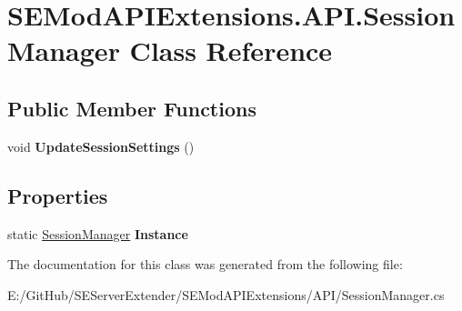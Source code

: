 \hypertarget{class_s_e_mod_a_p_i_extensions_1_1_a_p_i_1_1_session_manager}{}\section{S\+E\+Mod\+A\+P\+I\+Extensions.\+A\+P\+I.\+Session\+Manager Class Reference}
\label{class_s_e_mod_a_p_i_extensions_1_1_a_p_i_1_1_session_manager}
\subsection*{Public Member Functions}
\begin{DoxyCompactItemize}
\item 
\hypertarget{class_s_e_mod_a_p_i_extensions_1_1_a_p_i_1_1_session_manager_a7fa11b441157b3b4a8bed789d50aef69}{}void {\bfseries Update\+Session\+Settings} ()\label{class_s_e_mod_a_p_i_extensions_1_1_a_p_i_1_1_session_manager_a7fa11b441157b3b4a8bed789d50aef69}

\end{DoxyCompactItemize}
\subsection*{Properties}
\begin{DoxyCompactItemize}
\item 
\hypertarget{class_s_e_mod_a_p_i_extensions_1_1_a_p_i_1_1_session_manager_ab3a577816f6f3ab2f18a4bfef43f77eb}{}static \hyperlink{class_s_e_mod_a_p_i_extensions_1_1_a_p_i_1_1_session_manager}{Session\+Manager} {\bfseries Instance}\label{class_s_e_mod_a_p_i_extensions_1_1_a_p_i_1_1_session_manager_ab3a577816f6f3ab2f18a4bfef43f77eb}

\end{DoxyCompactItemize}


The documentation for this class was generated from the following file\+:\begin{DoxyCompactItemize}
\item 
E\+:/\+Git\+Hub/\+S\+E\+Server\+Extender/\+S\+E\+Mod\+A\+P\+I\+Extensions/\+A\+P\+I/Session\+Manager.\+cs\end{DoxyCompactItemize}

